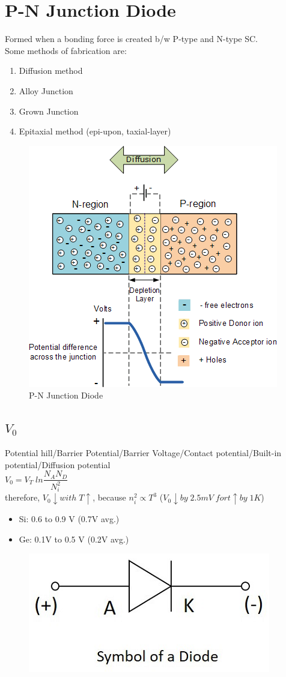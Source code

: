 \documentclass[10pt, a4paper]{report}
\begin{document}
	\section{P-N Junction Diode}
	Formed when a bonding force is created b/w P-type and N-type SC. \\
	Some methods of fabrication are:
	\begin{enumerate}
		\item Diffusion method
		\item Alloy Junction
		\item Grown Junction
		\item Epitaxial method (epi-upon, taxial-layer)
	\end{enumerate}
	\begin{figure}[h!]
		\centering
		\includegraphics[width=0.7\linewidth]{img/pn-diode}
		\caption{P-N Junction Diode}
		\label{fig:pn-diode}
	\end{figure}

	\subsection{$ V_0 $} Potential hill/Barrier Potential/Barrier Voltage/Contact potential/Built-in potential/Diffusion potential\\
	$ V_0 = V_T \; ln \dfrac{N_A N_D}{N_i^2} $ \\
	therefore, $ V_0 \downarrow with\;  T \uparrow $, because $ n_i^2 \propto T^3 $ ($ V_0 \downarrow by \; 2.5mV \; for t \uparrow by \; 1K $)
	\begin{itemize}
		\item Si: 0.6 to 0.9 V (0.7V avg.)
		\item Ge: 0.1V to 0.5 V (0.2V avg.)
	\end{itemize}
	\begin{figure}
		\centering
		\includegraphics[width=0.2\linewidth]{img/diode_symbol}
		\caption{}
		\label{fig:diodesymbol}
	\end{figure}
	
\end{document}
